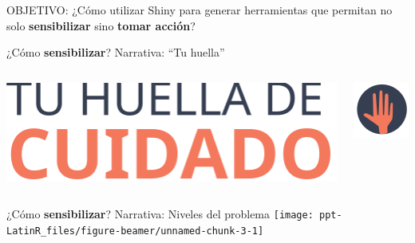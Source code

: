 \documentclass[
  ignorenonframetext,
]{beamer}
\begin{document}
\begin{frame}{OBJETIVO: ¿Cómo utilizar Shiny para generar herramientas
que permitan no solo \textbf{sensibilizar} sino \textbf{tomar acción}?}
\protect\hypertarget{objetivo-cuxf3mo-utilizar-shiny-para-generar-herramientas-que-permitan-no-solo-sensibilizar-sino-tomar-acciuxf3n}{}
\end{frame}

\begin{frame}{¿Cómo \textbf{sensibilizar}? Narrativa: ``Tu huella''}
\protect\hypertarget{cuxf3mo-sensibilizar-narrativa-tu-huella}{}
\begin{columns}[T]
\begin{column}{0.48\textwidth}
\includegraphics{img/group-3.svg}
\end{column}

\begin{column}{0.48\textwidth}
\includegraphics{img/manita_marcador.svg}
\end{column}
\end{columns}
\end{frame}

\begin{frame}{¿Cómo \textbf{sensibilizar}? Narrativa: Niveles del
problema}
\protect\hypertarget{cuxf3mo-sensibilizar-narrativa-niveles-del-problema}{}
\texttt{[image: ppt-LatinR\_files/figure-beamer/unnamed-chunk-3-1]}
\end{frame}
\end{document}
